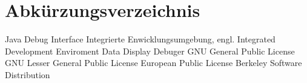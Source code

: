 
\chapter*{Abkürzungsverzeichnis}

\begin{acronym}
  {Java Debug Interface}
  {Integrierte Enwicklungsumgebung, engl. Integrated Development Enviroment}
  {Data Display Debuger}
  {GNU General Public License}
  {GNU Lesser General Public License}
  {European Public License}
  {Berkeley Software Distribution}
\end{acronym}
